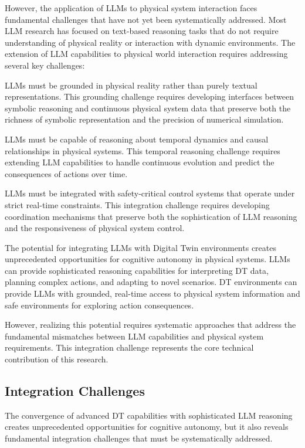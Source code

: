 However, the application of LLMs to physical system interaction faces fundamental challenges that have not yet been systematically addressed. Most LLM research has focused on text-based reasoning tasks that do not require understanding of physical reality or interaction with dynamic environments. The extension of LLM capabilities to physical world interaction requires addressing several key challenges:

LLMs must be grounded in physical reality rather than purely textual representations. This grounding challenge requires developing interfaces between symbolic reasoning and continuous physical system data that preserve both the richness of symbolic representation and the precision of numerical simulation.

LLMs must be capable of reasoning about temporal dynamics and causal relationships in physical systems. This temporal reasoning challenge requires extending LLM capabilities to handle continuous evolution and predict the consequences of actions over time.

LLMs must be integrated with safety-critical control systems that operate under strict real-time constraints. This integration challenge requires developing coordination mechanisms that preserve both the sophistication of LLM reasoning and the responsiveness of physical system control.

The potential for integrating LLMs with Digital Twin environments creates unprecedented opportunities for cognitive autonomy in physical systems. LLMs can provide sophisticated reasoning capabilities for interpreting DT data, planning complex actions, and adapting to novel scenarios. DT environments can provide LLMs with grounded, real-time access to physical system information and safe environments for exploring action consequences.

However, realizing this potential requires systematic approaches that address the fundamental mismatches between LLM capabilities and physical system requirements. This integration challenge represents the core technical contribution of this research.

\subsection{Integration Challenges}

The convergence of advanced DT capabilities with sophisticated LLM reasoning creates unprecedented opportunities for cognitive autonomy, but it also reveals fundamental integration challenges that must be systematically addressed.

